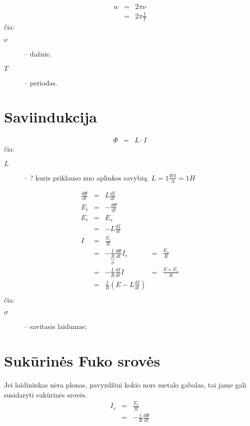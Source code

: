 \begin{defn}
  \begin{align*}
    w
    &=& 2 \pi \nu \\
    &=& 2 \pi \frac{1}{T} 
  \end{align*}
  čia:
  \begin{description}
    \item[$\nu$] – dažnis;
    \item[$T$] – periodas.
  \end{description}
\end{defn}

\section{Saviindukcija}

\begin{align*}
  \Phi &=& L \cdot I
\end{align*}
čia:
\begin{description}
  \item[$L$] – ? kuris priklauso nuo aplinkos savybių.
    $L = 1 \frac{Wb}{A} = 1H$
\end{description}

\begin{align*}
  \frac{d\Phi}{dt} &=& L \frac{dI}{dt} \\
  E_{i} &=& - \frac{d\Phi}{dt} \\
  E_{i} &=& E_{s} \\
  &=& - L \frac{dI}{dt} \\
  I &=& \frac{E_{i}}{R} \\
  &=& - \underbrace{\frac{1}{R}}_{\sigma} \frac{d\Phi}{dt}
  I_{s} &=&  \frac{E_{s}}{R} \\
  &=& - \frac{L}{R} \frac{dI}{dt}
  I &=& \frac{E + E_{s}}{R} \\
  &=& \frac{1}{R} \left( E - L \frac{dI}{dt} \right) \\
\end{align*}
čia:
\begin{description}
  \item[$\sigma$] – savitasis laidumas;
\end{description}

\section{Sukūrinės Fuko srovės}

Jei laidininkas nėra plonas, pavyzdžiui kokio nors metalo gabalas, tai jame
gali susidaryti sukūrinės srovės.
\begin{align*}
  I_{s} &=& \frac{E_{s}}{R} \\
  &=& - \frac{1}{R} \frac{d \Phi}{dt}
\end{align*}

